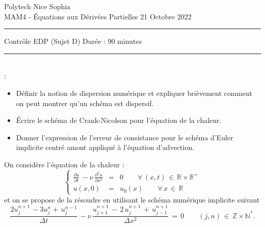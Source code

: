 \documentclass[12pt,a4paper]{article}
\begin{document}
 \hfill Polytech Nice Sophia\\
\noindent MAM4 - \'Equations aux D\'eriv\'ees Partielles \hfill 
21 Octobre 2022 \\

\hrule

\vspace{0.8cm}
\centerline {\large \sc Contrôle EDP (Sujet D) Dur\'ee : 90 minutes}
\vspace{0.8cm}


\hrule
\vspace{0.5cm}
\\

:
\begin{itemize}
\item Définir la notion de dispersion numérique et expliquer brièvement comment on peut montrer qu'un schéma est dispersif.
\item Écrire le schéma de Crank-Nicolson pour l'équation de la chaleur.
\item Donner l'expression de l'erreur de consistance pour le schéma d'Euler implicite centré amont appliqué à l'équation d'advection.
\end{itemize}

\vspace{0.5 cm}



\noindent On consid\`ere l'\'equation de la chaleur :
\begin{equation} \label{eqn:chaleur}
\left\{
\begin{array}{rcl}
\displaystyle \frac{\partial u}{\partial t} \, - \nu\, \frac{\partial^2 u}{\partial x^2}  & =  & 0  \qquad \forall \, (x,t) \, \in \, \mathbb{R} \times \mathbb{R}^+ \\
\displaystyle u(x,0)  & =  & u_0(x)  \qquad \forall \, x \, \in \, \mathbb{R}
\end{array}
\right.
\end{equation}
et on se propose de la r\'esoudre en utilisant le sch\'ema num\'erique implicite suivant
\begin{equation} \label{eqn:schema2}
\displaystyle  \frac{2u_j^{n+1} \, - 3u_j^n + \, u_j^{n-1}}{\Delta t} \, - \nu\,  \frac{u_{j+1}^{n+1} \,- \,  2 \, u_j^{n+1} \, + \, u_{j-1}^{n+1}}{\Delta x ^2 } \,  =  \,   0 \qquad (j,n) \, \in \, \mathbb{Z} \times \mathbb{N}^* .
\end{equation}
\end{document}
